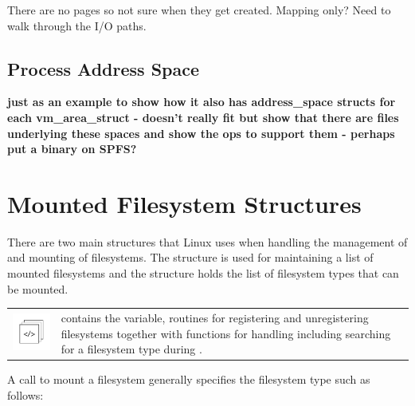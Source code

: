 \noindent
There are no pages so not sure when they get created. Mapping only? Need to walk through the I/O paths.

\subsection{Process Address Space}

\textbf{just as an example to show how it also has address\_space structs for each vm\_area\_struct - doesn't really fit but show that there are files underlying these spaces and show the ops to support them - perhaps put a binary on SPFS?}



\section{Mounted Filesystem Structures}\label{struct-mount}


There are two main structures that Linux uses when handling the management of and mounting of filesystems. The  structure is used for maintaining a list of mounted filesystems and the  structure holds the list of filesystem types that can be mounted. 

\begin{table}[h]
\begin{tabular}{ll}
    \parbox[l]{0.6in}{\includegraphics[scale=0.8]{figures/src-xref.pdf}} & \parbox[l]{4in}{\small{ contains the  variable, routines for registering and unregistering filesystems together with functions for handling  including searching for a filesystem type during .}}
\end{tabular}
\end{table}

\noindent
A call to mount a filesystem generally specifies the filesystem type such as follows:

